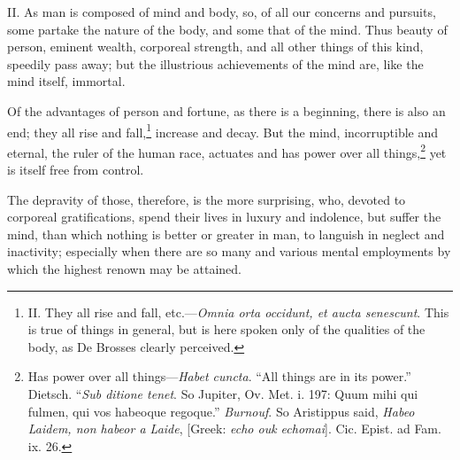II. As man is composed of mind and body, so, of all our concerns and
pursuits, some partake the nature of the body, and some that of the
mind. Thus beauty of person, eminent wealth, corporeal strength, and
all other things of this kind, speedily pass away; but the illustrious
achievements of the mind are, like the mind itself, immortal.

Of the advantages of person and fortune, as there is a beginning,
there is also an end; they all rise and fall,\footnote{II. They all rise and fall, etc.—\emph{Omnia orta occidunt, et
aucta senescunt}. This is true of things in general, but is here
spoken only of the qualities of the body, as De Brosses clearly
perceived.} increase and decay.
But the mind, incorruptible and eternal, the ruler of the human race,
actuates and has power over all things,\footnote{Has power over all things—\emph{Habet cuncta}. ``All things are in
its power.'' Dietsch. ``\emph{Sub ditione tenet}. So Jupiter, Ov. Met.
i. 197:
Quum mihi qui fulmen, qui vos habeoque regoque.''
\emph{Burnouf}. So Aristippus said, \emph{Habeo Laidem, non habeor a Laide},
[Greek: \emph{echo ouk echomai}]. Cic. Epist. ad Fam. ix. 26.} yet is itself free from
control.

The depravity of those, therefore, is the more surprising, who,
devoted to corporeal gratifications, spend their lives in luxury and
indolence, but suffer the mind, than which nothing is better or
greater in man, to languish in neglect and inactivity; especially when
there are so many and various mental employments by which the highest
renown may be attained.

